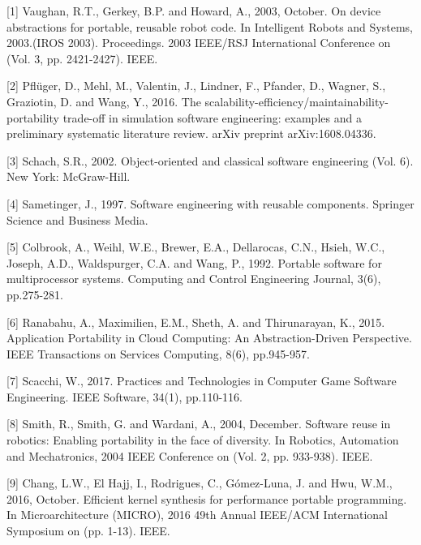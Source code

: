 \documentclass{scrartcl}
\begin{document}



[1] Vaughan, R.T., Gerkey, B.P. and Howard, A., 2003, October. On device abstractions for portable, reusable robot code. In Intelligent Robots and Systems, 2003.(IROS 2003). Proceedings. 2003 IEEE/RSJ International Conference on (Vol. 3, pp. 2421-2427). IEEE.

[2] Pflüger, D., Mehl, M., Valentin, J., Lindner, F., Pfander, D., Wagner, S., Graziotin, D. and Wang, Y., 2016. The scalability-efficiency/maintainability-portability trade-off in simulation software engineering: examples and a preliminary systematic literature review. arXiv preprint arXiv:1608.04336.

[3] Schach, S.R., 2002. Object-oriented and classical software engineering (Vol. 6). New York: McGraw-Hill.

[4] Sametinger, J., 1997. Software engineering with reusable components. Springer Science and Business Media.

[5] Colbrook, A., Weihl, W.E., Brewer, E.A., Dellarocas, C.N., Hsieh, W.C., Joseph, A.D., Waldspurger, C.A. and Wang, P., 1992. Portable software for multiprocessor systems. Computing and Control Engineering Journal, 3(6), pp.275-281.

[6] Ranabahu, A., Maximilien, E.M., Sheth, A. and Thirunarayan, K., 2015. Application Portability in Cloud Computing: An Abstraction-Driven Perspective. IEEE Transactions on Services Computing, 8(6), pp.945-957.

[7] Scacchi, W., 2017. Practices and Technologies in Computer Game Software Engineering. IEEE Software, 34(1), pp.110-116.

[8] Smith, R., Smith, G. and Wardani, A., 2004, December. Software reuse in robotics: Enabling portability in the face of diversity. In Robotics, Automation and Mechatronics, 2004 IEEE Conference on (Vol. 2, pp. 933-938). IEEE.

[9] Chang, L.W., El Hajj, I., Rodrigues, C., Gómez-Luna, J. and Hwu, W.M., 2016, October. Efficient kernel synthesis for performance portable programming. In Microarchitecture (MICRO), 2016 49th Annual IEEE/ACM International Symposium on (pp. 1-13). IEEE.
\end{document}
